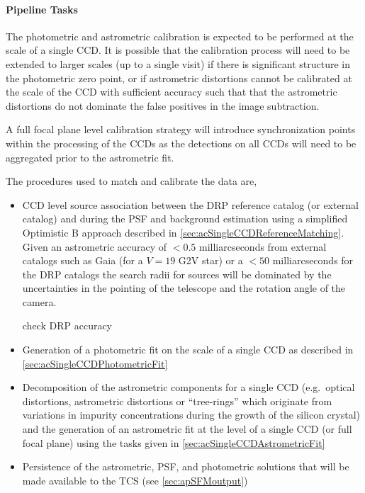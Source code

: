 \paragraph{Pipeline Tasks}
The photometric and astrometric calibration is expected to be performed at the scale of a single CCD. It is possible that the calibration process will need to be extended to larger scales (up to a single visit) if there is significant structure in the photometric zero point, or if astrometric distortions cannot be calibrated at the scale of the CCD with sufficient accuracy such that that the astrometric distortions do not dominate the false positives in the image subtraction.

A full focal plane level calibration strategy will introduce synchronization points within the processing of the CCDs as the detections on all CCDs will need to be aggregated prior to the astrometric fit.

The procedures used to match and calibrate the data are,
\begin{itemize}
\item CCD level source association between the DRP reference catalog (or external catalog) and \Sources  during the PSF and background estimation using a simplified Optimistic B approach described in \ref{sec:acSingleCCDReferenceMatching}. Given an astrometric accuracy of $<0.5$ milliarcseconds from external catalogs such as Gaia (for a $V=19$ G2V star) or a $<50$ milliarcseconds for the DRP catalogs the search radii for sources will be dominated by the uncertainties in the pointing of the telescope and the rotation angle of the camera.
\begin{note} check DRP accuracy \end{note}
\item Generation of a photometric fit on the scale of a single CCD as described in \ref{sec:acSingleCCDPhotometricFit}
\item Decomposition of the astrometric components for a single CCD (e.g.\ optical distortions, astrometric distortions or ``tree-rings'' which originate from variations in impurity concentrations during the growth of the silicon crystal) and the generation of  an astrometric fit at the level of a single CCD (or full focal plane) using the tasks given in \ref{sec:acSingleCCDAstrometricFit}
\item Persistence of the astrometric, PSF, and photometric solutions that will be made available to the TCS (see \ref{sec:apSFMoutput})
\end{itemize}

